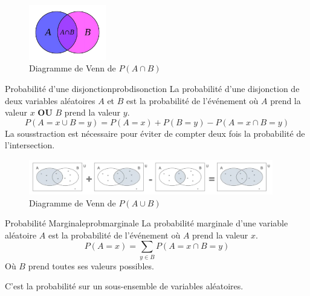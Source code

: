 \begin{figure}[H]
    \begin{center}
        \includegraphics[width=0.3\textwidth]{pictures/conjproba.jpg}
    \end{center}
    \caption{Diagramme de Venn de $P(A \cap B)$}\label{fig:conjproba}
\end{figure}



\begin{definition}{Probabilité d'une disjonction}{probdisonction}
    La probabilité d'une disjonction de deux variables aléatoires $A$ et $B$ est la probabilité de l'événement 
    où $A$ prend la valeur $x$ \textbf{OU} $B$ prend la valeur $y$.
    \begin{equation}
        P(A=x \cup B=y) = P(A=x) + P(B=y) - P(A=x\cap B=y)
    \end{equation}
    La sousstraction est nécessaire pour éviter de compter deux fois la probabilité de l'intersection.
\end{definition}

\begin{figure}[H]
    \begin{center}
        \includegraphics[width=0.95\textwidth]{pictures/disjproba.png}
    \end{center}
    \caption{Diagramme de Venn de $P(A \cup B)$}\label{fig:disjproba}
\end{figure}




\begin{definition}{Probabilité Marginale}{probmarginale}
    La probabilité marginale d'une variable aléatoire $A$ est la probabilité de l'événement 
    où $A$ prend la valeur $x$.
    \begin{equation}
        P(A=x) = \sum_{y \in B} P(A=x \cap B=y)
    \end{equation} 
    Où $B$ prend toutes ses valeurs possibles.
    
\end{definition}
\begin{remark}\leavevmode
    C'est la probabilité sur un sous-ensemble de variables aléatoires.
\end{remark}

